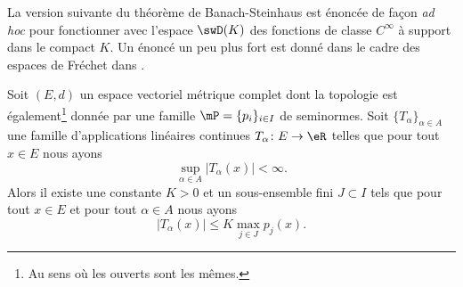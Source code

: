 La version suivante du théorème de Banach-Steinhaus est énoncée de façon \emph{ad hoc} pour fonctionner avec l'espace \( \swD(K)\) des fonctions de classe \(  C^{\infty}\) à support dans le compact \( K\). Un énoncé un peu plus fort est donné dans le cadre des espaces de Fréchet dans \cite{TQSWRiz}.
\begin{theorem}  \label{ThoNBrmGIg}
    Soit \( (E,d)\) un espace vectoriel métrique complet dont la topologie est également\footnote{Au sens où les ouverts sont les mêmes.} donnée par une famille \( \mP=\{ p_i \}_{i\in I}\) de seminormes. Soit \( \{ T_{\alpha} \}_{\alpha\in A}\) une famille d'applications linéaires continues \( T_{\alpha}\colon E\to \eR\) telles que pour tout \( x\in E\) nous ayons
    \begin{equation}
        \sup_{\alpha\in A}\big| T_{\alpha}(x) \big|<\infty.
    \end{equation}
    Alors il existe une constante \( K>0\) et un sous-ensemble fini \( J\subset I\) tels que pour tout \( x\in E\) et pour tout \( \alpha\in A\) nous ayons
    \begin{equation}    \label{EqIFNGhtr}
        \big| T_{\alpha} (x)\big|\leq K\max_{j\in J}p_j(x).
    \end{equation}
\end{theorem}

